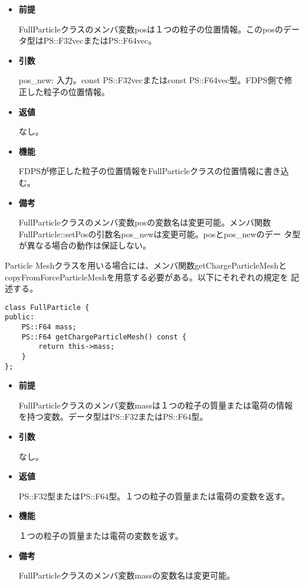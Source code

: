 \begin{itemize}

\item {\bf 前提}

  FullParticleクラスのメンバ変数posは１つの粒子の位置情報。このposのデー
  タ型はPS::F32vecまたはPS::F64vec。

\item {\bf 引数}

  pos\_new: 入力。const PS::F32vecまたはconst PS::F64vec型。FDPS側で修
  正した粒子の位置情報。

\item {\bf 返値}

  なし。
  
\item {\bf 機能}

  FDPSが修正した粒子の位置情報をFullParticleクラスの位置情報に書き込む。

\item {\bf 備考}

  FullParticleクラスのメンバ変数posの変数名は変更可能。メンバ関数
  FullParticle::setPosの引数名pos\_newは変更可能。posとpos\_newのデー
  タ型が異なる場合の動作は保証しない。

\end{itemize}


Particle Meshクラスを用いる場合には、メンバ関数getChargeParticleMeshと
copyFromForceParticleMeshを用意する必要がある。以下にそれぞれの規定を
記述する。


\begin{screen}
\begin{verbatim}
class FullParticle {
public:
    PS::F64 mass;
    PS::F64 getChargeParticleMesh() const {
        return this->mass;
    }
};
\end{verbatim}
\end{screen}

\begin{itemize}

\item {\bf 前提}

  FullParticleクラスのメンバ変数massは１つの粒子の質量または電荷の情報
  を持つ変数。データ型はPS::F32またはPS::F64型。

\item {\bf 引数}

  なし。

\item {\bf 返値}

  PS::F32型またはPS::F64型。１つの粒子の質量または電荷の変数を返す。
  
\item {\bf 機能}

  １つの粒子の質量または電荷の変数を返す。

\item {\bf 備考}

  FullParticleクラスのメンバ変数massの変数名は変更可能。

\end{itemize}


